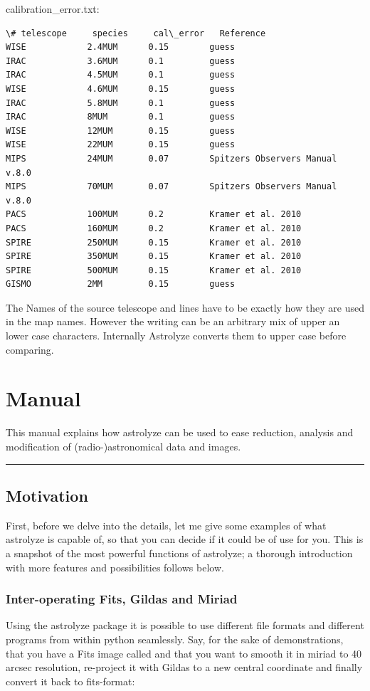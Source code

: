 \documentclass[a4paper,10pt,english]{sphinxmanual}
\begin{document}
calibration\_error.txt:

\begin{Verbatim}[commandchars=\\\{\}]
\# telescope     species     cal\_error   Reference
WISE            2.4MUM      0.15        guess
IRAC            3.6MUM      0.1         guess
IRAC            4.5MUM      0.1         guess
WISE            4.6MUM      0.15        guess
IRAC            5.8MUM      0.1         guess
IRAC            8MUM        0.1         guess
WISE            12MUM       0.15        guess
WISE            22MUM       0.15        guess
MIPS            24MUM       0.07        Spitzers Observers Manual v.8.0
MIPS            70MUM       0.07        Spitzers Observers Manual v.8.0
PACS            100MUM      0.2         Kramer et al. 2010
PACS            160MUM      0.2         Kramer et al. 2010
SPIRE           250MUM      0.15        Kramer et al. 2010
SPIRE           350MUM      0.15        Kramer et al. 2010
SPIRE           500MUM      0.15        Kramer et al. 2010
GISMO           2MM         0.15        guess
\end{Verbatim}

The Names of the source telescope and lines have to be exactly how they are
used in the map names. However the writing can be an arbitrary mix of upper an
lower case characters. Internally Astrolyze converts them to upper case before
comparing.


\chapter{Manual}
\label{manual:manual}\label{manual::doc}
This manual explains how astrolyze can be used to ease reduction,
analysis and modification of (radio-)astronomical data and images.


\bigskip\hrule{}\bigskip



\section{Motivation}
\label{manual:motivation}
First, before we delve into the details, let me give some examples of what
astrolyze is capable of, so that you can decide if it could be of use for you.
This is a snapshot of the most powerful functions of astrolyze; a thorough
introduction with more features and possibilities follows below.


\subsection{Inter-operating Fits, Gildas and Miriad}
\label{manual:inter-operating-fits-gildas-and-miriad}
Using the astrolyze package it is possible to use different file formats and
different programs from within python seamlessly. Say, for the sake of
demonstrations, that you have a Fits image called
 and that you want to smooth it in miriad to 40
arcsec resolution, re-project it with Gildas to a new central coordinate and
finally convert it back to fits-format:
\end{document}
